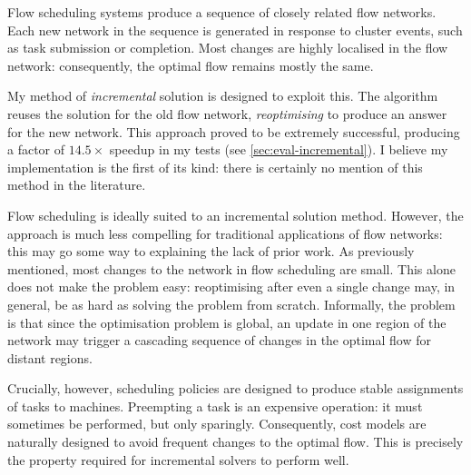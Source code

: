 
Flow scheduling systems produce a sequence of closely related flow networks. Each new network in the sequence is generated in response to cluster events, such as task submission or completion. Most changes are highly localised in the flow network: consequently, the optimal flow remains mostly the same.

My method of \emph{incremental} solution is designed to exploit this. The algorithm reuses the solution for the old flow network, \emph{reoptimising} to produce an answer for the new network. This approach proved to be extremely successful, producing a factor of $14.5\times$ speedup in my tests (see \cref{sec:eval-incremental}). I believe my implementation is the first of its kind: there is certainly no mention of this method in the literature.

Flow scheduling is ideally suited to an incremental solution method. However, the approach is much less compelling for traditional applications of flow networks: this may go some way to explaining the lack of prior work. As previously mentioned, most changes to the network in flow scheduling are small. This alone does not make the problem easy: reoptimising after even a single change may, in general, be as hard as solving the problem from scratch\footnotemark. Informally, the problem is that since the optimisation problem is global, an update in one region of the network may trigger a cascading sequence of changes in the optimal flow for distant regions.

Crucially, however, scheduling policies are designed to produce stable assignments of tasks to machines. Preempting a task is an expensive operation: it must sometimes be performed, but only sparingly. Consequently, cost models are naturally designed to avoid frequent changes to the optimal flow. This is precisely the property required for incremental solvers to perform well.

